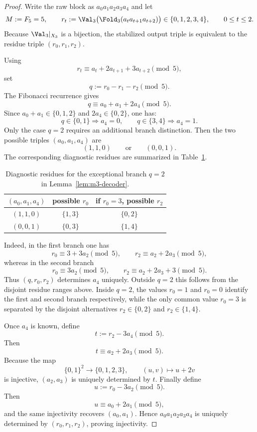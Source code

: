 \begin{proof}
Write the raw block as $a_0a_1a_2a_3a_4$ and let
\[
M:=F_5=5,
\qquad
r_t:=\Val_3\bigl(\Fold_3(a_ta_{t+1}a_{t+2})\bigr)\in\{0,1,2,3,4\},
\qquad 0\le t\le 2.
\]
Because $\Val_3|_{X_3}$ is a bijection, the stabilized output triple is
equivalent to the residue triple $(r_0,r_1,r_2)$.

Using
\[
r_t\equiv a_t+2a_{t+1}+3a_{t+2}\pmod 5,
\]
set
\[
q:=r_0-r_1-r_2\pmod 5.
\]
The Fibonacci recurrence gives
\[
q\equiv a_0+a_1+2a_4\pmod 5.
\]
Since $a_0+a_1\in\{0,1,2\}$ and $2a_4\in\{0,2\}$, one has:
\[
q\in\{0,1\}\Longrightarrow a_4=0,
\qquad
q\in\{3,4\}\Longrightarrow a_4=1.
\]
Only the case $q=2$ requires an additional branch distinction. Then the two
possible triples $(a_0,a_1,a_4)$ are
\[
(1,1,0)\qquad\text{or}\qquad (0,0,1).
\]
The corresponding diagnostic residues are summarized in
Table~\ref{tab:m3-decoder}.

\begin{table}[t]
\centering
\caption{Diagnostic residues for the exceptional branch $q=2$ in Lemma~\ref{lem:m3-decoder}.}
\label{tab:m3-decoder}
\begin{tabular}{ccc}
\toprule
$(a_0,a_1,a_4)$ & possible $r_0$ & if $r_0=3$, possible $r_2$ \\
\midrule
$(1,1,0)$ & $\{1,3\}$ & $\{0,2\}$ \\
$(0,0,1)$ & $\{0,3\}$ & $\{1,4\}$ \\
\bottomrule
\end{tabular}
\end{table}

Indeed, in the first branch one has
\[
r_0\equiv 3+3a_2\pmod 5,
\qquad
r_2\equiv a_2+2a_3\pmod 5,
\]
whereas in the second branch
\[
r_0\equiv 3a_2\pmod 5,
\qquad
r_2\equiv a_2+2a_3+3\pmod 5.
\]
Thus $(q,r_0,r_2)$ determines $a_4$ uniquely. Outside $q=2$ this follows from
the disjoint residue ranges above. Inside $q=2$, the values $r_0=1$ and
$r_0=0$ identify the first and second branch respectively, while the only
common value $r_0=3$ is separated by the disjoint alternatives
$r_2\in\{0,2\}$ and $r_2\in\{1,4\}$.

Once $a_4$ is known, define
\[
t:=r_2-3a_4\pmod 5.
\]
Then
\[
t\equiv a_2+2a_3\pmod 5.
\]
Because the map
\[
\{0,1\}^2\to\{0,1,2,3\},\qquad (u,v)\mapsto u+2v
\]
is injective, $(a_2,a_3)$ is uniquely determined by $t$. Finally define
\[
u:=r_0-3a_2\pmod 5.
\]
Then
\[
u\equiv a_0+2a_1\pmod 5,
\]
and the same injectivity recovers $(a_0,a_1)$. Hence
$a_0a_1a_2a_3a_4$ is uniquely determined by $(r_0,r_1,r_2)$, proving
injectivity.
\end{proof}

